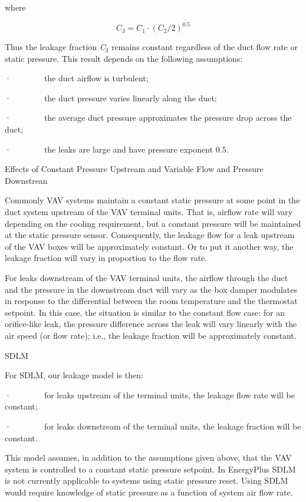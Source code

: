 where

\begin{equation}
{C_3} = {C_1} \cdot {({C_2}/2)^{0.5}}
\end{equation}

Thus the leakage fraction \emph{C}\(_{3}\) remains constant regardless of the duct flow rate or static pressure. This result depends on the following assumptions:

·~~~~~~~~the duct airflow is turbulent;

·~~~~~~~~the duct pressure varies linearly along the duct;

·~~~~~~~~the average duct pressure approximates the pressure drop across the duct;

·~~~~~~~~the leaks are large and have pressure exponent 0.5.

Effects of Constant Pressure Upstream and Variable Flow and Pressure Downstrean

Commonly VAV systems maintain a constant static pressure at some point in the duct system upstream of the VAV terminal units. That is, airflow rate will vary depending on the cooling requirement, but a constant pressure will be maintained at the static pressure sensor. Consequently, the leakage flow for a leak upstream of the VAV boxes will be approximately constant. Or to put it another way, the leakage fraction will vary in proportion to the flow rate.

For leaks downstream of the VAV terminal units, the airflow through the duct and the pressure in the downstream duct will vary as the box damper modulates in response to the differential between the room temperature and the thermostat setpoint. In this case, the situation is similar to the constant flow case: for an orifice-like leak, the pressure difference across the leak will vary linearly with the air speed (or flow rate); i.e., the leakage fraction will be approximately constant.

SDLM

For SDLM, our leakage model is then:

·~~~~~~~~for leaks upstream of the terminal units, the leakage flow rate will be constant;

·~~~~~~~~for leaks downstream of the terminal units, the leakage fraction will be constant.

This model assumes, in addition to the assumptions given above, that the VAV system is controlled to a constant static pressure setpoint. In EnergyPlus SDLM is not currently applicable to systems using static pressure reset. Using SDLM would require knowledge of static pressure as a function of system air flow rate.

